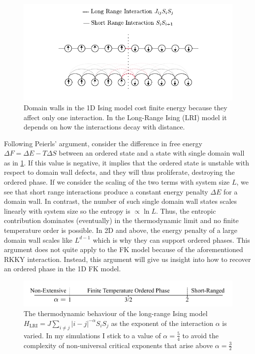 \hypertarget{fig:ising_model_domain_wall}{%
\begin{figure}
\centering
\includegraphics[width=1\textwidth,height=\textheight]{figure_code/intro_chapter/ising_model_domain_wall}
\caption[{Domain walls in the long-range Ising Model}]{Domain walls in the 1D Ising model cost finite energy because they affect only one interaction. In the Long-Range Ising (LRI) model it depends on how the interactions decay with distance.}
\label{fig:ising_model_domain_wall}
\end{figure}
}

Following Peierls' argument, consider the difference in free energy \(\Delta F = \Delta E - T\Delta S\) between an ordered state and a state with single domain wall as in \cref{fig:ising_model_domain_wall}. If this value is negative, it implies that the ordered state is unstable with respect to domain wall defects, and they will thus proliferate, destroying the ordered phase. If we consider the scaling of the two terms with system size \(L\), we see that short range interactions produce a constant energy penalty \(\Delta E\) for a domain wall. In contrast, the number of such single domain wall states scales linearly with system size so the entropy is \(\propto \ln L\). Thus, the entropic contribution dominates (eventually) in the thermodynamic limit and no finite temperature order is possible. In 2D and above, the energy penalty of a large domain wall scales like \(L^{d-1}\) which is why they can support ordered phases. This argument does not quite apply to the FK model because of the aforementioned RKKY interaction. Instead, this argument will give us insight into how to recover an ordered phase in the 1D FK model.

\hypertarget{fig:alpha_diagram}{%
\begin{figure}
\centering
\includegraphics[width=1\textwidth,height=\textheight]{figure_code/background_chapter/alpha_diagram}
\caption[{Long-Range Ising Model Behaviour}]{The thermodynamic behaviour of the long-range Ising model \(H_{\mathrm{LRI}} = J \sum_{i\neq j} |i - j|^{-\alpha} S_i S_j\) as the exponent of the interaction \(\alpha\) is varied. In my simulations I stick to a value of \(\alpha = \tfrac{5}{4}\) to avoid the complexity of non-universal critical exponents that arise above \(\alpha = \tfrac{3}{2}\)}
\label{fig:alpha_diagram}
\end{figure}
}

